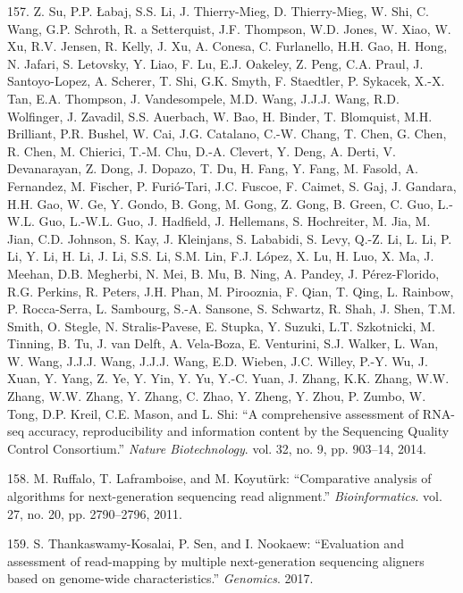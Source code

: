 \documentclass[12pt,a4paper,twoside]{ugathesis}
\theoremstyle{definition}
\theoremstyle{definition}
\theoremstyle{definition}
\theoremstyle{remark}
\begin{document}
\hypertarget{ref-Su2014}{}
157. Z. Su, P.P. Łabaj, S.S. Li, J. Thierry-Mieg, D. Thierry-Mieg, W.
Shi, C. Wang, G.P. Schroth, R. a Setterquist, J.F. Thompson, W.D. Jones,
W. Xiao, W. Xu, R.V. Jensen, R. Kelly, J. Xu, A. Conesa, C. Furlanello,
H.H. Gao, H. Hong, N. Jafari, S. Letovsky, Y. Liao, F. Lu, E.J. Oakeley,
Z. Peng, C.A. Praul, J. Santoyo-Lopez, A. Scherer, T. Shi, G.K. Smyth,
F. Staedtler, P. Sykacek, X.-X. Tan, E.A. Thompson, J. Vandesompele,
M.D. Wang, J.J.J. Wang, R.D. Wolfinger, J. Zavadil, S.S. Auerbach, W.
Bao, H. Binder, T. Blomquist, M.H. Brilliant, P.R. Bushel, W. Cai, J.G.
Catalano, C.-W. Chang, T. Chen, G. Chen, R. Chen, M. Chierici, T.-M.
Chu, D.-A. Clevert, Y. Deng, A. Derti, V. Devanarayan, Z. Dong, J.
Dopazo, T. Du, H. Fang, Y. Fang, M. Fasold, A. Fernandez, M. Fischer, P.
Furió-Tari, J.C. Fuscoe, F. Caimet, S. Gaj, J. Gandara, H.H. Gao, W. Ge,
Y. Gondo, B. Gong, M. Gong, Z. Gong, B. Green, C. Guo, L.-W.L. Guo,
L.-W.L. Guo, J. Hadfield, J. Hellemans, S. Hochreiter, M. Jia, M. Jian,
C.D. Johnson, S. Kay, J. Kleinjans, S. Lababidi, S. Levy, Q.-Z. Li, L.
Li, P. Li, Y. Li, H. Li, J. Li, S.S. Li, S.M. Lin, F.J. López, X. Lu, H.
Luo, X. Ma, J. Meehan, D.B. Megherbi, N. Mei, B. Mu, B. Ning, A. Pandey,
J. Pérez-Florido, R.G. Perkins, R. Peters, J.H. Phan, M. Pirooznia, F.
Qian, T. Qing, L. Rainbow, P. Rocca-Serra, L. Sambourg, S.-A. Sansone,
S. Schwartz, R. Shah, J. Shen, T.M. Smith, O. Stegle, N. Stralis-Pavese,
E. Stupka, Y. Suzuki, L.T. Szkotnicki, M. Tinning, B. Tu, J. van Delft,
A. Vela-Boza, E. Venturini, S.J. Walker, L. Wan, W. Wang, J.J.J. Wang,
J.J.J. Wang, E.D. Wieben, J.C. Willey, P.-Y. Wu, J. Xuan, Y. Yang, Z.
Ye, Y. Yin, Y. Yu, Y.-C. Yuan, J. Zhang, K.K. Zhang, W.W. Zhang, W.W.
Zhang, Y. Zhang, C. Zhao, Y. Zheng, Y. Zhou, P. Zumbo, W. Tong, D.P.
Kreil, C.E. Mason, and L. Shi: ``A comprehensive assessment of RNA-seq
accuracy, reproducibility and information content by the Sequencing
Quality Control Consortium.'' \emph{Nature Biotechnology}. vol. 32, no.
9, pp. 903--14, 2014.

\hypertarget{ref-Ruffalo2011}{}
158. M. Ruffalo, T. Laframboise, and M. Koyutürk: ``Comparative analysis
of algorithms for next-generation sequencing read alignment.''
\emph{Bioinformatics}. vol. 27, no. 20, pp. 2790--2796, 2011.

\hypertarget{ref-Thankaswamy-Kosalai2017}{}
159. S. Thankaswamy-Kosalai, P. Sen, and I. Nookaew: ``Evaluation and
assessment of read-mapping by multiple next-generation sequencing
aligners based on genome-wide characteristics.'' \emph{Genomics}. 2017.
\end{document}
